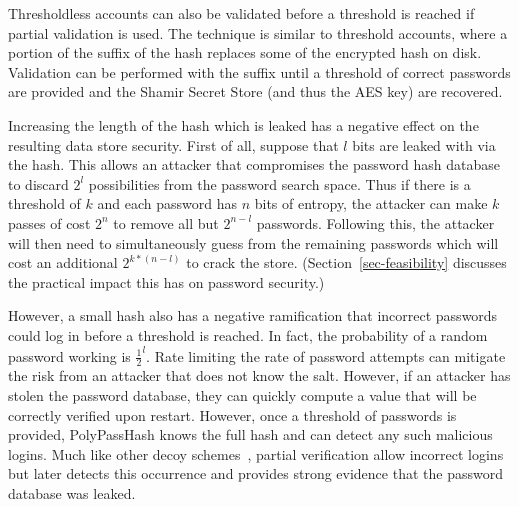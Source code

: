 Thresholdless accounts can also be validated before a threshold is reached
if partial validation is used.   The technique is similar to threshold 
accounts, where a portion of the suffix of the hash replaces
some of the encrypted hash on disk.   Validation can be 
performed with the suffix until a threshold of correct passwords are provided
and the Shamir Secret Store (and thus the AES key) are recovered.

Increasing the length of the hash which is leaked has a negative 
effect on the resulting data store security.
First of all, suppose that $l$ bits are leaked with via the hash.
This allows an attacker that compromises the password hash database to 
discard $2^l$ possibilities from the password search space.   Thus
if there is a threshold of $k$ and each password has $n$ bits of entropy, 
the attacker can make $k$ passes of cost $2^n$ to remove all but $2^{n-l}$
passwords.   Following this, the attacker will then need to simultaneously
guess from the remaining passwords which will cost an additional $2^{k*(n-l)}$
to crack the store.   (Section~\ref{sec-feasibility} discusses the practical
impact this has on password security.)

However, a small hash also has a negative ramification that
incorrect passwords could log in before a threshold is reached.   In fact,
the probability of a random password working is $\frac{1}{2}^l$.   Rate
limiting the rate of password attempts can mitigate the risk from an attacker
that does not know the salt.   However, if an attacker has stolen the password 
database, they can quickly compute a value that will be correctly verified 
upon restart.  However, once a threshold of passwords is provided,
PolyPassHash knows the full hash and can detect any such
malicious logins.   Much like other decoy schemes~\cite{juels2013honeywords,
Kontaxis_CCS_2013}, partial verification allow incorrect logins but
later detects this occurrence and provides strong evidence that the password
database was leaked.






